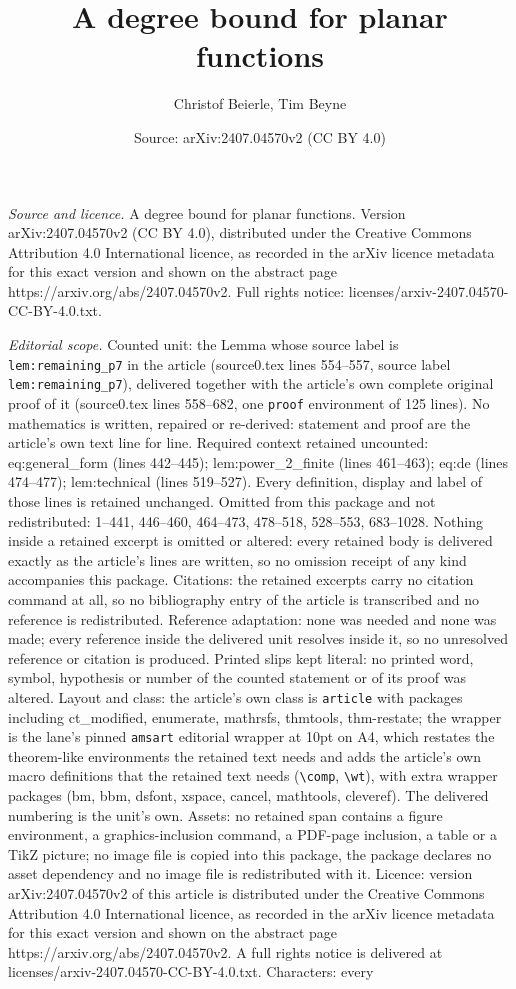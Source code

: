 \documentclass[10pt,a4paper]{amsart}
\title[A degree bound for planar functions]{A degree bound for planar functions}
\author{Christof Beierle, Tim Beyne}
\date{Source: arXiv:2407.04570v2 (CC BY 4.0)}
\begin{document}
\maketitle

\noindent\emph{Source and licence.} A degree bound for planar functions. Version arXiv:2407.04570v2 (CC BY 4.0), distributed under the Creative Commons Attribution 4.0 International licence, as recorded in the arXiv licence metadata for this exact version and shown on the abstract page https://arxiv.org/abs/2407.04570v2. Full rights notice: licenses/arxiv-2407.04570-CC-BY-4.0.txt.\par\smallskip

\noindent\textit{Editorial scope.} Counted unit: the Lemma whose source label is \texttt{lem:remaining\_p7} in the article (source0.tex lines 554--557, source label \texttt{lem:remaining\_p7}), delivered together with the article's own complete original proof of it (source0.tex lines 558--682, one \texttt{proof} environment of 125 lines). No mathematics is written, repaired or re-derived: statement and proof are the article's own text line for line. Required context retained uncounted: eq:general\_form (lines 442--445); lem:power\_2\_finite (lines 461--463); eq:de (lines 474--477); lem:technical (lines 519--527). Every definition, display and label of those lines is retained unchanged. Omitted from this package and not redistributed: 1--441, 446--460, 464--473, 478--518, 528--553, 683--1028. Nothing inside a retained excerpt is omitted or altered: every retained body is delivered exactly as the article's lines are written, so no omission receipt of any kind accompanies this package. Citations: the retained excerpts carry no citation command at all, so no bibliography entry of the article is transcribed and no reference is redistributed. Reference adaptation: none was needed and none was made; every reference inside the delivered unit resolves inside it, so no unresolved reference or citation is produced. Printed slips kept literal: no printed word, symbol, hypothesis or number of the counted statement or of its proof was altered. Layout and class: the article's own class is \texttt{article} with packages including ct\_modified, enumerate, mathrsfs, thmtools, thm-restate; the wrapper is the lane's pinned \texttt{amsart} editorial wrapper at 10pt on A4, which restates the theorem-like environments the retained text needs and adds the article's own macro definitions that the retained text needs (\texttt{\textbackslash comp}, \texttt{\textbackslash wt}), with extra wrapper packages (bm, bbm, dsfont, xspace, cancel, mathtools, cleveref). The delivered numbering is the unit's own. Assets: no retained span contains a figure environment, a graphics-inclusion command, a PDF-page inclusion, a table or a TikZ picture; no image file is copied into this package, the package declares no asset dependency and no image file is redistributed with it. Licence: version arXiv:2407.04570v2 of this article is distributed under the Creative Commons Attribution 4.0 International licence, as recorded in the arXiv licence metadata for this exact version and shown on the abstract page https://arxiv.org/abs/2407.04570v2. A full rights notice is delivered at licenses/arxiv-2407.04570-CC-BY-4.0.txt. Characters: every 
\end{document}
